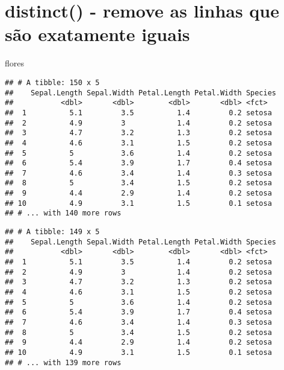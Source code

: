 \documentclass[]{book}
\newenvironment{Shaded}{\begin{snugshade}}{\end{snugshade}}
\newcommand{\KeywordTok}[1]{\textcolor[rgb]{0.13,0.29,0.53}{\textbf{#1}}}
\newcommand{\NormalTok}[1]{#1}
\newcommand{\OperatorTok}[1]{\textcolor[rgb]{0.81,0.36,0.00}{\textbf{#1}}}
\newcommand{\StringTok}[1]{\textcolor[rgb]{0.31,0.60,0.02}{#1}}
\begin{document}
\hypertarget{distinct---remove-as-linhas-que-suxe3o-exatamente-iguais}{%
\section{distinct() - remove as linhas que são exatamente iguais}\label{distinct---remove-as-linhas-que-suxe3o-exatamente-iguais}}

\begin{Shaded}
\begin{Highlighting}[]
\NormalTok{flores}
\end{Highlighting}
\end{Shaded}

\begin{verbatim}
## # A tibble: 150 x 5
##    Sepal.Length Sepal.Width Petal.Length Petal.Width Species
##           <dbl>       <dbl>        <dbl>       <dbl> <fct>  
##  1          5.1         3.5          1.4         0.2 setosa 
##  2          4.9         3            1.4         0.2 setosa 
##  3          4.7         3.2          1.3         0.2 setosa 
##  4          4.6         3.1          1.5         0.2 setosa 
##  5          5           3.6          1.4         0.2 setosa 
##  6          5.4         3.9          1.7         0.4 setosa 
##  7          4.6         3.4          1.4         0.3 setosa 
##  8          5           3.4          1.5         0.2 setosa 
##  9          4.4         2.9          1.4         0.2 setosa 
## 10          4.9         3.1          1.5         0.1 setosa 
## # ... with 140 more rows
\end{verbatim}

\begin{Shaded}
\end{Shaded}

\begin{verbatim}
## # A tibble: 149 x 5
##    Sepal.Length Sepal.Width Petal.Length Petal.Width Species
##           <dbl>       <dbl>        <dbl>       <dbl> <fct>  
##  1          5.1         3.5          1.4         0.2 setosa 
##  2          4.9         3            1.4         0.2 setosa 
##  3          4.7         3.2          1.3         0.2 setosa 
##  4          4.6         3.1          1.5         0.2 setosa 
##  5          5           3.6          1.4         0.2 setosa 
##  6          5.4         3.9          1.7         0.4 setosa 
##  7          4.6         3.4          1.4         0.3 setosa 
##  8          5           3.4          1.5         0.2 setosa 
##  9          4.4         2.9          1.4         0.2 setosa 
## 10          4.9         3.1          1.5         0.1 setosa 
## # ... with 139 more rows
\end{verbatim}
\end{document}

